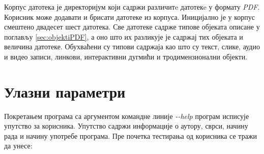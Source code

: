 \documentclass[12pt,oneside]{memoir}
\begin{document}
Корпус датотека је директоријум који садржи различитe датотекe у формату \textit{PDF}. Корисник може додавати и брисати датотеке из корпуса. Иницијално је у корпус смештено двадесет шест датотека. Све датотеке садрже типове објеката описане у поглављу \ref{sec:objektiPDF}, а оно што их разликује је садржај тих објеката и величина датотеке. Обухваћени су типови садржаја као што су текст, слике, аудио и видео записи, линкови, интерактивни дугмићи и тродимензионални објекти. 

\section{Улазни параметри}
\label{sec:ulazniParametri}

Покретањем програма са аргументом командне линије \textit{-{}-help} програм исписује упутство за корисника. Упутство садржи информације о аутору, сврси, начину рада и начину употребе програма. Пре почетка тестирања од корисника се тражи да унесе:
\end{document}
